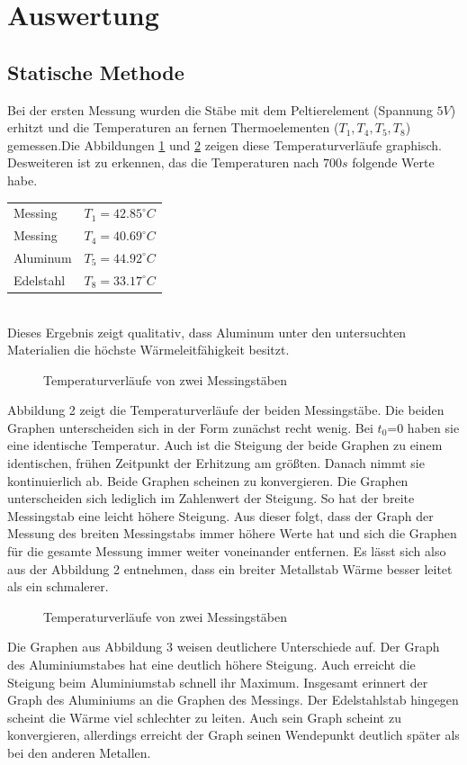 \documentclass[11pt]{article}
\begin{document}
\section{Auswertung}
\subsection{Statische Methode}

Bei der ersten Messung wurden die Stäbe mit dem Peltierelement (Spannung $5V$) erhitzt und die Temperaturen an fernen Thermoelementen ($T_1, T_4, T_5, T_8$) gemessen.Die Abbildungen \ref{T1T4} und \ref{T5T8} zeigen diese Temperaturverläufe graphisch. Desweiteren ist zu erkennen, das die Temperaturen nach $700s$ folgende Werte habe.

\begin{tabular}{@{$\bullet$  }ll}
Messing &$T_1= 42.85 ^\circ C$\\
Messing &$T_4 =  40.69 ^\circ C$\\
Aluminum &$T_5 = 44.92 ^\circ C$\\
Edelstahl &$T_8 =33.17 ^\circ C$\\

\end{tabular}\\
Dieses Ergebnis zeigt qualitativ, dass Aluminum unter den untersuchten Materialien die höchste Wärmeleitfähigkeit besitzt.
\begin{figure}[h]
\caption{Temperaturverläufe von zwei Messingstäben}
\label{T1T4}
\end{figure}
\newline
Abbildung 2 zeigt die Temperaturverläufe der beiden Messingstäbe. Die beiden Graphen unterscheiden sich in der Form zunächst recht wenig. Bei $t_0$=0 haben sie eine identische Temperatur. Auch ist die Steigung der beide Graphen zu einem identischen, frühen Zeitpunkt der Erhitzung am größten. Danach nimmt sie kontinuierlich ab. Beide Graphen scheinen zu konvergieren.\newline
Die Graphen unterscheiden sich lediglich im Zahlenwert der Steigung. So hat der breite Messingstab eine leicht höhere Steigung. Aus dieser folgt, dass der Graph der Messung des breiten Messingstabs immer höhere Werte hat und sich die Graphen für die gesamte Messung immer weiter voneinander entfernen.
Es lässt sich also aus der Abbildung 2 entnehmen, dass ein breiter Metallstab Wärme besser leitet als ein schmalerer.
\begin{figure}[h]
\centering
\caption{Temperaturverläufe von zwei Messingstäben}
\label{T5T8}
\end{figure}
\newline
Die Graphen aus Abbildung 3 weisen deutlichere Unterschiede auf. Der Graph des Aluminiumstabes hat eine deutlich höhere Steigung. Auch erreicht die Steigung beim Aluminiumstab schnell ihr Maximum. Insgesamt erinnert der Graph des Aluminiums an die Graphen des Messings. Der Edelstahlstab hingegen scheint die Wärme viel schlechter zu leiten. Auch sein Graph scheint zu konvergieren, allerdings erreicht der Graph seinen Wendepunkt deutlich später als bei den anderen Metallen.
\end{document}
